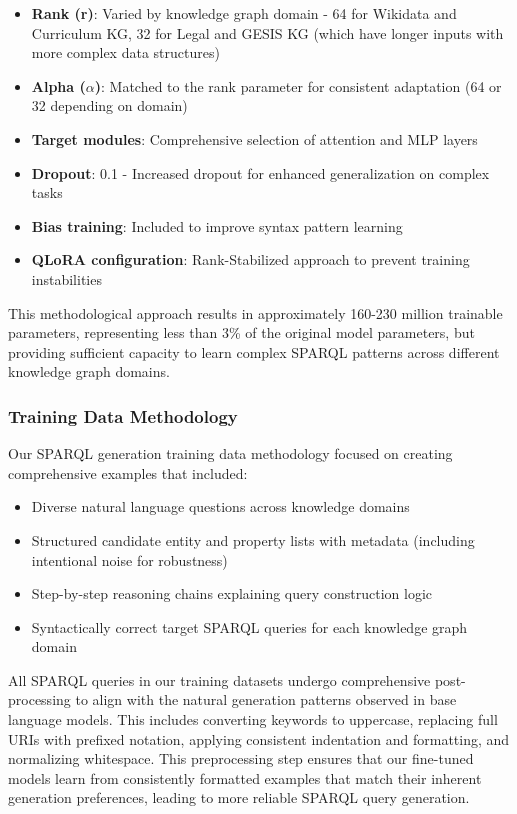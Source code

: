 \begin{itemize}
    \item \textbf{Rank (r)}: Varied by knowledge graph domain - 64 for Wikidata and Curriculum KG, 32 for Legal and GESIS KG (which have longer inputs with more complex data structures)
    \item \textbf{Alpha ($\alpha$)}: Matched to the rank parameter for consistent adaptation (64 or 32 depending on domain)
    \item \textbf{Target modules}: Comprehensive selection of attention and MLP layers
    \item \textbf{Dropout}: 0.1 - Increased dropout for enhanced generalization on complex tasks
    \item \textbf{Bias training}: Included to improve syntax pattern learning
    \item \textbf{QLoRA configuration}: Rank-Stabilized approach to prevent training instabilities
\end{itemize}

This methodological approach results in approximately 160-230 million trainable parameters, representing less than 3\% of the original model parameters, but providing sufficient capacity to learn complex SPARQL patterns across different knowledge graph domains.

\subsubsection{Training Data Methodology}
Our SPARQL generation training data methodology focused on creating comprehensive examples that included:

\begin{itemize}
    \item Diverse natural language questions across knowledge domains
    \item Structured candidate entity and property lists with metadata (including intentional noise for robustness)
    \item Step-by-step reasoning chains explaining query construction logic
    \item Syntactically correct target SPARQL queries for each knowledge graph domain
\end{itemize}

All SPARQL queries in our training datasets undergo comprehensive post-processing to align with the natural generation patterns observed in base language models. This includes converting keywords to uppercase, replacing full URIs with prefixed notation, applying consistent indentation and formatting, and normalizing whitespace. This preprocessing step ensures that our fine-tuned models learn from consistently formatted examples that match their inherent generation preferences, leading to more reliable SPARQL query generation.

